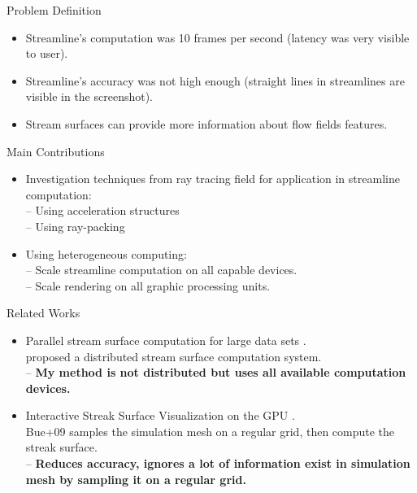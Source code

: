 \documentclass{beamer}
\begin{document}
\begin{frame}{Problem Definition}
	\begin{itemize}
		\item Streamline's computation was 10 frames per second (latency was very visible to user).
		\item Streamline's accuracy was not high enough (straight lines in streamlines are visible in the screenshot).
		\item Stream surfaces can provide more information about flow fields features.
	\end{itemize}
\end{frame}

\begin{frame}{Main Contributions}
	\begin{itemize}
		\item Investigation techniques from ray tracing field for application in streamline computation:\\
		  -- Using acceleration structures\\
		  -- Using ray-packing\\
		\item Using heterogeneous computing:\\
		  -- Scale streamline computation on all capable devices.\\
		  -- Scale rendering on all graphic processing units.\\
	\end{itemize}

\end{frame}

\begin{frame}{Related Works}
	\begin{itemize}
		\item Parallel stream surface computation for large data sets \cite{CampPaper}.\\
		proposed a distributed stream surface computation system.\\
		-- \textbf{My method is not distributed but uses all available computation devices.}
		\item Interactive Streak Surface Visualization on the GPU \cite{BurgerStreakSurface}.\\
		Bue+09 samples the simulation mesh on a regular grid, then compute the streak surface.\\
		-- \textbf{Reduces accuracy, ignores a lot of information exist in simulation mesh by sampling it on a regular grid.}
	\end{itemize}
\end{frame}
\end{document}

